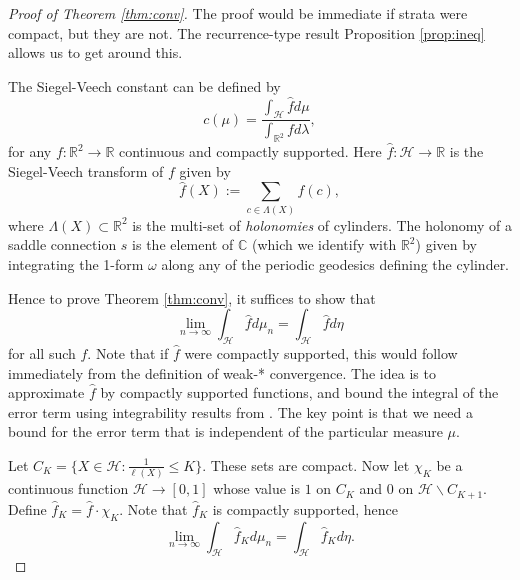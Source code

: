 \documentclass{article}
\theoremstyle{definition}
\begin{document}
\begin{proof}[Proof of Theorem \ref{thm:conv}] 
The proof would be immediate if strata were compact, but they are not.  The recurrence-type result Proposition \ref{prop:ineq} allows us to get around this.    

The Siegel-Veech constant can be defined by 
$$c(\mu) = \frac{\int_{\mathcal{H}} \hat f d\mu }{\int_{\mathbb{R}^2}f d\lambda},$$
for any $f:\mathbb{R}^2\to \mathbb{R}$ continuous and compactly supported.  Here $\hat f:\mathcal{H} \to \mathbb{R}$ is the Siegel-Veech transform of $f$ given by 
$$\hat f(X) := \sum_{c\in \Lambda(X)} f(c),$$
where $\Lambda(X)\subset \mathbb{R}^2$ is the multi-set of \emph{holonomies} of cylinders.  The holonomy of a saddle connection $s$ is the element of $\mathbb{C}$ (which we identify with $\mathbb{R}^2$) given by integrating the 1-form $\omega$ along any of the periodic geodesics defining the cylinder.  


Hence to prove Theorem \ref{thm:conv}, it suffices to show that 
$$\lim_{n\to\infty} \int_{\mathcal{H}} \hat f d\mu_n = \int_{\mathcal{H}} \hat f d\eta $$
for all such $f$.  Note that if $\hat f$ were compactly supported, this would follow immediately from the definition of weak-* convergence.  The idea is to approximate $\hat f$ by compactly supported functions, and bound the integral of the error term using integrability results from \cite{em2001}.  The key point is that we need a bound for the error term that is independent of the particular measure $\mu$.  

Let $C_K= \{X\in \mathcal{H} : \frac{1}{\ell(X)} \le K\}$.  These sets are compact.  Now let $\chi_K$ be a continuous function $\mathcal{H}\to [0,1]$ whose value is $1$ on $C_K$ and $0$ on $\mathcal{H} \backslash C_{K+1}$.  Define $\hat f_K = \hat f \cdot \chi_K$.  Note that $\hat f_K$ is compactly supported, hence
$$\lim_{n\to\infty} \int_{\mathcal{H}} \hat f_K d\mu_n = \int_{\mathcal{H}} \hat f_K d\eta.$$


\end{proof}
\end{document}
